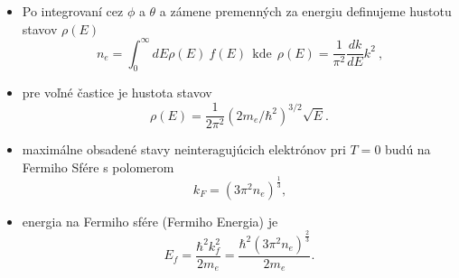 \documentclass[
	11pt, %
]{beamer}
\begin{document}
\begin{frame}


\begin{itemize}
\item Po integrovaní cez $\phi$ a $\theta$ a zámene premenných za energiu definujeme hustotu stavov $\rho(E)$
\begin{equation}
 \label{eq:N integral sfer energ}
 n_e =   \int_0^{\infty}dE\rho(E)\ f(E) \ \ \text{kde}\ \ \rho(E)=\frac{1}{\pi^2} \frac{dk}{dE} k^2  \ \text{,}
\end{equation}
\item pre voľné častice je hustota stavov 
\begin{equation}
 \label{eq:rho_par}
 \rho(E)=\frac{1}{2\pi^2}{(2 m_e/\hbar^2)}^{3/2} \sqrt{E} \text{.}
\end{equation}
\item maximálne obsadené stavy  neinteragujúcich elektrónov pri $T=0$ budú na Fermiho Sfére s polomerom
\begin{equation}
 \label{eq:kf}
 k_F=(3\pi^2 n_e)^{\frac{1}{3}}\text{,}
\end{equation}
\item energia na Fermiho sfére (Fermiho Energia) je
\begin{equation}
 \label{eq:ef}
 E_f=\frac{\hbar^2 k_f^2}{2m_e}=\frac{\hbar^2(3\pi^2 n_e)^{\frac{2}{3}}  }{2m_e} \text{.}
\end{equation}
\end{itemize}
\end{frame}
\end{document}

